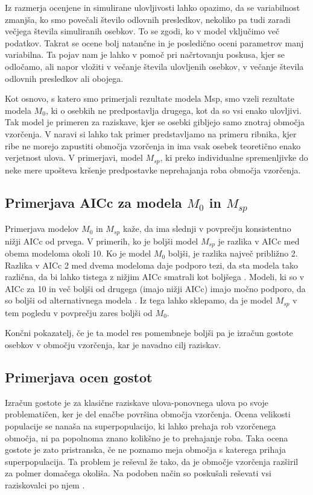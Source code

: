 Iz razmerja ocenjene in simulirane ulovljivosti lahko opazimo, da se variabilnost zmanjša, ko smo povečali število odlovnih presledkov, nekoliko pa tudi zaradi večjega števila simuliranih osebkov. To se zgodi, ko v model vključimo več podatkov. Takrat se ocene bolj natančne in je posledično oceni parametrov manj variabilna. Ta pojav nam je lahko v pomoč pri načrtovanju poskusa, kjer se odločamo, ali napor vložiti v večanje števila ulovljenih osebkov, v večanje števila odlovnih presledkov ali obojega.

Kot osnovo, s katero smo primerjali rezultate modela Msp, smo vzeli rezultate modela $M_0$, ki o osebkih ne predpostavlja drugega, kot da so vsi enako ulovljivi. Tak model je primeren za raziskave, kjer se osebki gibljejo samo znotraj območja vzorčenja. V naravi si lahko tak primer predstavljamo na primeru ribnika, kjer ribe ne morejo zapustiti območja vzorčenja in ima vsak osebek teoretično enako verjetnost ulova. V primerjavi, model $M_{sp}$, ki preko individualne spremenljivke do neke mere upošteva kršenje predpostavke neprehajanja roba območja vzorčenja.

\subsection{Primerjava AICc za modela $M_0$ in $M_{sp}$}
Primerjava modelov $M_0$ in $M_{sp}$ kaže, da ima slednji v povprečju konsistentno nižji AICc od prvega. V primerih, ko je boljši model $M_{sp}$ je razlika v AICc med obema modeloma okoli 10. Ko je model $M_0$ boljši, je razlika največ približno 2. Razlika v AICc 2 med dvema modeloma daje podporo tezi, da sta modela tako različna, da bi lahko tistega z nižjim AICc smatrali kot boljšega \citep{boulanger_corrigendum:_2001}. Modeli, ki so v AICc za 10 in več boljši od drugega (imajo nižji AICc) imajo močno podporo, da so boljši od alternativnega modela \citep[stran 71]{burnham_model_2002}. Iz tega lahko sklepamo, da je model $M_{sp}$ v tem pogledu v povprečju zares boljši od $M_0$.

Končni pokazatelj, če je ta model res pomembneje boljši pa je izračun gostote osebkov v območju vzorčenja, kar je navadno cilj raziskav.

\subsection{Primerjava ocen gostot}
Izračun gostote je za klasične raziskave ulova-ponovnega ulova po svoje problematičen, ker je del enačbe površina območja vzorčenja. Ocena velikosti populacije se nanaša na superpopulacijo, ki lahko prehaja rob vzorčenega območja, ni pa popolnoma znano kolikšno je to prehajanje roba. Taka ocena gostote je zato pristranska, če ne poznamo meja območja s katerega prihaja superpopulacija. Ta problem je reševal že \citep{dice_census_1938} tako, da je območje vzorčenja razširil za polmer domačega okoliša. Na podoben način so poskušali reševati vsi raziskovalci po njem \citep{williams_analysis_2002}.

